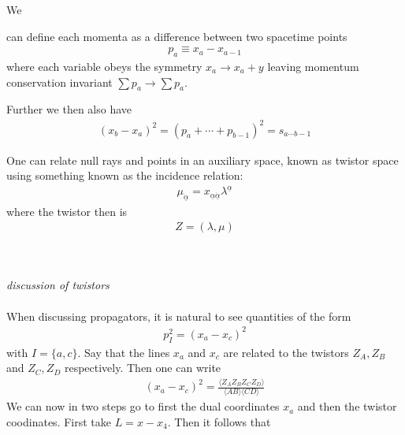 \documentclass[letter,12pt]{article}
\newcommand{\la}{\langle}
\newcommand{\ra}{\rangle}
\begin{document}
We{\tiny  can define each momenta as a difference between two spacetime points
\begin{equation}
	\begin{aligned}
		p_a\equiv x_a-x_{a-1}
	\end{aligned}
\end{equation}
where each variable obeys the symmetry $x_a\to x_a+y$ leaving momentum conservation invariant $\sum p_a\to \sum p_a$. 

Further we then also have 
\begin{equation}
	\begin{aligned}
		(x_b-x_a)^2=(p_a+\cdots +p_{b-1} )^2=s_{a\cdots b-1}
	\end{aligned}
\end{equation}

One can relate null rays and points in an auxiliary space, known as twistor space using something known as the incidence relation:
\begin{equation}
	\begin{aligned}
		\mu_{\underline{\dot{\alpha}}}=x_{\underline{\alpha}\underline{\dot{\alpha}}}\lambda^{\underline{\alpha}}
	\end{aligned}
\end{equation} 
where the twistor then is 
\begin{equation}
	\begin{aligned}
		Z=(\lambda,\mu)
	\end{aligned}
\end{equation}}
\\\\
\textit{discussion of twistors}
\\\\
When discussing propagators, it is natural to see quantities of the form
\begin{equation}
	\begin{aligned}
		p_I^2=(x_a-x_c)^2
	\end{aligned}
\end{equation}
with $I=\{a,c\}$. Say that the lines $x_a$ and $x_c$ are related to the twistors $Z_A,Z_B$ and $Z_C,Z_D$ respectively. Then one can write
\begin{equation}
	\begin{aligned} \label{eq:incidence}
		(x_a-x_c)^2=\frac{\la Z_A Z_B Z_C Z_D\ra}{\la A B\ra \la C D\ra }
	\end{aligned}
\end{equation}
We can now in two steps go to first the dual coordinates $x_a$ and then the twistor coodinates. First take $L=x-x_4$. Then it follows that
\end{document}
